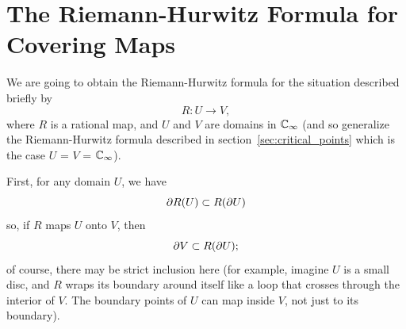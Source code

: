 \section{The Riemann-Hurwitz Formula for Covering Maps}

We are going to obtain the Riemann-Hurwitz formula for the situation described
briefly by
\begin{equation*}
    R: U \to V,
\end{equation*}
where $R$ is a rational map, and $U$ and $V$ are domains in $\mathbb{C}_\infty$ (and so
generalize the Riemann-Hurwitz formula described in
section~\ref{sec:critical_points} which is the case $U$ = $V$ = $\mathbb{C}_\infty$).

\begin{remark}[For any domain $U$, $V = R(U)$: $\boundary{V} \subset R(\boundary{U})$]
    First, for any domain $U$, we have
    \begin{equation*}
        \partial {R(U)} \subset R(\partial {U})
    \end{equation*}
    so, if $R$ maps $U$ onto $V$, then
    \begin{equation}
        \label{eq:V_in_R_of_the_boundary_of_U}
        \partial {V} \subset R(\partial {U});
    \end{equation}
    of course, there may be strict inclusion here (for example, imagine $U$ is a
    small disc, and $R$ wraps its boundary around itself like a loop that
    crosses through the interior of $V$. The boundary points of $U$ can map
    inside $V$, not just to its boundary).
\end{remark}
